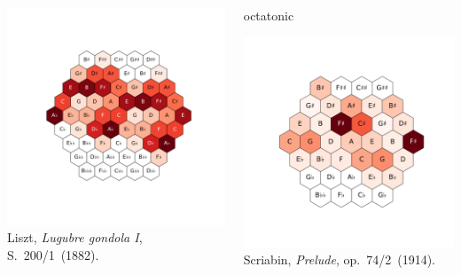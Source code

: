 \begin{frame}{\insertsectionhead}
\begin{columns}
\begin{column}{.33\linewidth}
      \includegraphics[trim=0 100 0 100, clip, width=\linewidth]{img/liszt.pdf}
      Liszt, \emph{Lugubre gondola I}, S.~200/1~(1882).
    \end{column}
    \pause
    \begin{column}{.33\linewidth}
      \centering
      \alert{octatonic}

      \vspace{1em}

      \includegraphics[trim=0 130 0 100, clip, width=\linewidth]{img/scriabin.pdf}
      Scriabin, \emph{Prelude}, op.~74/2~(1914).
    \end{column}
  \end{columns}


\end{frame}
